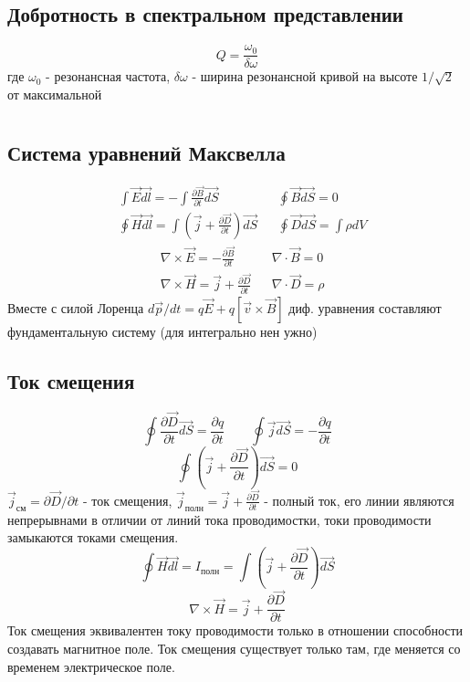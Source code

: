 \documentclass{article}
\begin{document}
\subsection{Добротность в спектральном представлении}
\[ Q = \frac{\omega_0}{\delta \omega}\]
где $\omega_0$ - резонансная частота, $\delta \omega$ - ширина резонансной кривой на высоте $1/\sqrt{2}$ от максимальной


\section{}
\subsection{Система уравнений Максвелла}
\[\boxed{\begin{aligned}
& \int \vec{E}\vec{dl}=-\int \frac{\partial \vec{B}}{\partial t}\vec{dS}  & & \oint \vec{B}\vec{dS}=0 \\
& \oint \vec{H}\vec{dl}=\int(\vec{j}+\frac{\partial \vec{D}}{\partial t})\vec{dS} & & \oint\vec{D}\vec{dS}=\int\rho dV 
\end{aligned}}\]
\[\boxed{\begin{aligned}
& \nabla \times \vec{E}=-\frac{\partial \vec{B}}{\partial t} & & \nabla \cdot \vec{B}=0 \\
& \nabla \times \vec{H} = \vec{j} + \frac{\partial \vec{D}}{\partial t} & & \nabla \cdot \vec{D} = \rho
\end{aligned}}\]
Вместе с силой Лоренца $d\vec{p}/dt=q\vec{E}+q[\vec{v}\times\vec{B}]$ диф. уравнения составляют фундаментальную систему (для интегрально нен ужно)
\subsection{Ток смещения}
\[\oint \frac{\partial \vec{D}}{\partial t}\vec{dS}=\frac{\partial q}{\partial t} \qquad \oint \vec{j}\vec{dS}=-\frac{\partial q}{\partial t}\]
\[\oint (\vec{j} + \frac{\partial \vec{D}}{\partial t})\vec{dS}=0\]
$\vec{j}_{\text{см}}=\partial\vec{D}/\partial t$ - ток смещения, $\vec{j}_{\text{полн}}=\vec{j}+\frac{\partial \vec{D}}{\partial t}$ - полный ток, его линии являются непрерывнами в отличии от линий тока проводимостки, токи проводимости замыкаются токами смещения.
\[\oint \vec{H}\vec{dl}=I_{\text{полн}}=\int(\vec{j}+\frac{\partial \vec{D}}{\partial t})\vec{dS}\]
\[\nabla \times \vec{H}=\vec{j}+\frac{\partial \vec{D}}{\partial t}\]
Ток смещения эквивалентен току проводимости только в отношении способности создавать магнитное поле. Ток смещения существует только там, где меняется со временем электрическое поле.
\end{document}
